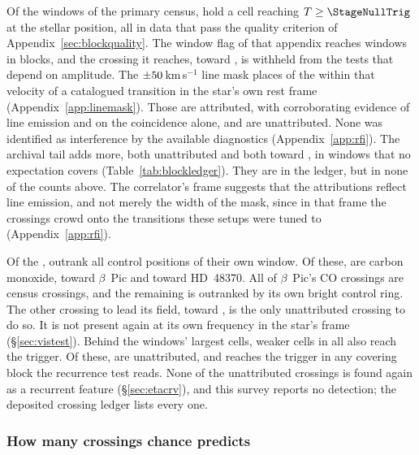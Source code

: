 Of the \NWindows{} windows of the primary census, \CsNCross{} hold a cell
reaching $T\geq\StageNullTrig$ at the stellar position, all in data that pass
the quality criterion of Appendix~\ref{sec:blockquality}. The window flag of
that appendix reaches \DqNWin{} windows in \BkFlagNBlock{} blocks, and the
\BkFlagNCrossOtherWord{} crossing it reaches, toward \BkFlagOtherStar, is
withheld from the tests that depend on amplitude. The
$\pm50$\,km\,s$^{-1}$ line mask places \MkNCoinc{} of the
\CsNCrossQp{} within that velocity of a catalogued transition in the star's
own rest frame (Appendix~\ref{app:linemask}). Those \CsNAttrQp{} are
attributed, \LnAttrSupp{} with corroborating evidence of line emission and
\LnAttrCoinc{} on the coincidence alone, and \CsNUnattrQp{} are
unattributed. None was identified as interference by the available
diagnostics (Appendix~\ref{app:rfi}). The archival tail adds
\CeNTailCrossWord{} more, both unattributed and both toward \CeTailStar, in
windows that no expectation covers (Table~\ref{tab:blockledger}). They are in
the ledger, but in none of the counts above. The correlator's frame
suggests that the attributions reflect line emission, and not merely the
width of the mask, since in that frame the crossings crowd onto the
transitions these setups were tuned to (Appendix~\ref{app:rfi}).

Of the \CsNCrossQp, \LrStageN{} outrank all \NCtrl{} control positions of
their own window. Of these, \LrStageNCo{} are carbon monoxide,
\JqNBpCoWord{} toward $\beta$~Pic and \JqNHdCoWord{} toward HD~48370. All
\BpicPanelNCo{} of $\beta$~Pic's CO crossings are census crossings, and the
remaining \JqNBpCoOutWord{} is outranked by its own bright control ring. The
other crossing to lead its field, toward \EvAStar, is the only unattributed
crossing to do so. It is not present again at its own frequency in the
star's frame (\S\ref{sec:vistest}). Behind the
windows' largest cells, \CkNSecondaryWord{} weaker cells in all also reach the
trigger. Of these, \CkNSecUnattrWord{} are unattributed, and \CkNRecurWord{} reaches the
trigger in any covering block the recurrence test reads. None of the unattributed
crossings is found again as a recurrent feature (\S\ref{sec:etacrv}), and
this survey reports no detection; the deposited crossing ledger lists every
one.

\subsubsection{How many crossings chance predicts}
\label{sec:trigunif}

